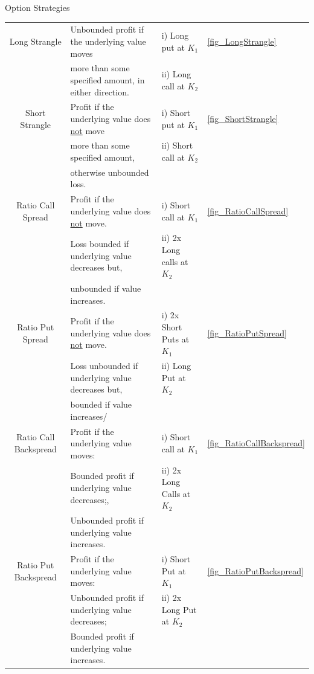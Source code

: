 \documentclass[11pt,a4paper]{article}
\begin{document}
\begin{definition}{Option Strategies}
\begin{adjustwidth}{-1.5cm}{}
\begin{tabular}{|c|l|l|l|}
        Long Strangle&Unbounded profit if the underlying value moves&i) Long put at $K_1$&\ref{fig_LongStrangle}\\
        &more than some specified amount, in either direction.&ii) Long call at $K_2$&\\\hline

        Short Strangle&Profit if the underlying value does \underline{not} move&i) Short put at $K_1$&\ref{fig_ShortStrangle}\\
        & more than some specified amount,&ii) Short call at $K_2$&\\
        &otherwise unbounded loss.&&\\\hline

        Ratio Call Spread&Profit if the underlying value does \underline{not} move.&i) Short call at $K_1$&\ref{fig_RatioCallSpread}\\
        &Loss bounded if underlying value decreases but,&ii) 2x Long calls at $K_2$&\\
        &unbounded if value increases.&&\\\hline

        Ratio Put Spread&Profit if the underlying value does \underline{not} move.&i) 2x Short Puts at $K_1$&\ref{fig_RatioPutSpread}\\
        &Loss unbounded if underlying value decreases but,&ii) Long Put at $K_2$&\\
        &bounded if value increases/&&\\\hline

        Ratio Call Backspread&Profit if the underlying value moves:&i) Short call at $K_1$&\ref{fig_RatioCallBackspread}\\
        &Bounded profit if underlying value decreases;,&ii) 2x Long Calls at $K_2$&\\
        &Unbounded profit if underlying value increases.&&\\\hline

        Ratio Put Backspread&Profit if the underlying value moves:&i) Short Put at $K_1$&\ref{fig_RatioPutBackspread}\\
        &Unbounded profit if underlying value decreases;&ii) 2x Long Put at $K_2$&\\
        &Bounded profit if underlying value increases.&&\\\hline
      \end{tabular}
    \end{adjustwidth}
  \end{definition}
\end{document}
